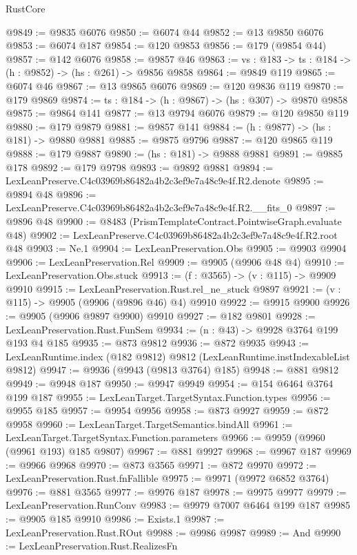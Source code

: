 \begin{lexlean}{RustCore}
\begin{coremodule}
@9849 := @9835 @6076
@9850 := @6074 @44
@9852 := @13 @9850 @6076
@9853 := @6074 @187
@9854 := @120 @9853
@9856 := @179 (@9854 @44)
@9857 := @142 @6076
@9858 := @9857 @46
@9863 := {vs : @183} -> {ts : @184} -> (h : @9852) -> (hs : @261) -> @9856 @9858
@9864 := @9849 @119
@9865 := @6074 @46
@9867 := @13 @9865 @6076
@9869 := @120 @9836 @119
@9870 := @179 @9869
@9874 := {ts : @184} -> (h : @9867) -> (hs : @307) -> @9870 @9858
@9875 := @9864 @141
@9877 := @13 @9794 @6076
@9879 := @120 @9850 @119
@9880 := @179 @9879
@9881 := @9857 @141
@9884 := (h : @9877) -> (hs : @181) -> @9880 @9881
@9885 := @9875 @9796
@9887 := @120 @9865 @119
@9888 := @179 @9887
@9890 := (hs : @181) -> @9888 @9881
@9891 := @9885 @178
@9892 := @179 @9798
@9893 := @9892 @9881
@9894 := LexLeanPreserve.C4c03969b86482a4b2c3ef9e7a48c9e4f.R2.denote
@9895 := @9894 @48
@9896 := LexLeanPreserve.C4c03969b86482a4b2c3ef9e7a48c9e4f.R2.__fits_0
@9897 := @9896 @48
@9900 := @8483 (PrismTemplateContract.PointwiseGraph.evaluate @48)
@9902 := LexLeanPreserve.C4c03969b86482a4b2c3ef9e7a48c9e4f.R2.root @48
@9903 := Ne.{1}
@9904 := LexLeanPreservation.Obs
@9905 := @9903 @9904
@9906 := LexLeanPreservation.Rel
@9909 := @9905 (@9906 @48 @4)
@9910 := LexLeanPreservation.Obs.stuck
@9913 := (f : @3565) -> (v : @115) -> @9909 @9910
@9915 := LexLeanPreservation.Rust.rel_ne_stuck @9897
@9921 := (v : @115) -> @9905 (@9906 (@9896 @46) @4) @9910
@9922 := @9915 @9900
@9926 := @9905 (@9906 @9897 @9900) @9910
@9927 := @182 @9801
@9928 := LexLeanPreservation.Rust.FunSem
@9934 := (n : @43) -> @9928 @3764 @199 @193 @4 @185
@9935 := @873 @9812
@9936 := @872 @9935
@9943 := LexLeanRuntime.index (@182 @9812) @9812 (LexLeanRuntime.instIndexableList @9812)
@9947 := @9936 (@9943 (@9813 @3764) @185)
@9948 := @881 @9812
@9949 := @9948 @187
@9950 := @9947 @9949
@9954 := @154 @6464 @3764 @199 @187
@9955 := LexLeanTarget.TargetSyntax.Function.types
@9956 := @9955 @185
@9957 := @9954 @9956
@9958 := @873 @9927
@9959 := @872 @9958
@9960 := LexLeanTarget.TargetSemantics.bindAll
@9961 := LexLeanTarget.TargetSyntax.Function.parameters
@9966 := @9959 (@9960 (@9961 @193) @185 @9807)
@9967 := @881 @9927
@9968 := @9967 @187
@9969 := @9966 @9968
@9970 := @873 @3565
@9971 := @872 @9970
@9972 := LexLeanPreservation.Rust.fnFallible
@9975 := @9971 (@9972 @6852 @3764)
@9976 := @881 @3565
@9977 := @9976 @187
@9978 := @9975 @9977
@9979 := LexLeanPreservation.RunConv
@9983 := @9979 @7007 @6464 @199 @187
@9985 := @9905 @185 @9910
@9986 := Exists.{1}
@9987 := LexLeanPreservation.Rust.ROut
@9988 := @9986 @9987
@9989 := And
@9990 := LexLeanPreservation.Rust.RealizesFn

\end{coremodule}
\end{lexlean}
